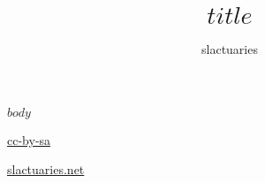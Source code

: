 \documentclass{article}
\title{$title$}
\author{slactuaries}
\begin{document}
\maketitle

$body$

\href{https://creativecommons.org/licenses/by-sa/4.0/}{cc-by-sa}

\href{https://slactuaries.net/}{slactuaries.net}
\end{document}
